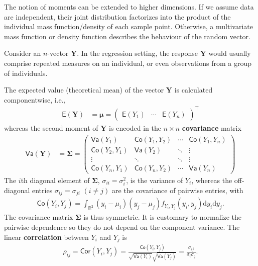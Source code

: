 \documentclass[
  11pt,
  letterpaper,
]{book}
\theoremstyle{definition}
\theoremstyle{definition}
\theoremstyle{definition}
\theoremstyle{remark}
\begin{document}
The notion of moments can be extended to higher dimensions. If we assume data are independent, their joint distribution factorizes into the product of the individual mass function/density of each sample point. Otherwise, a multivariate mass function or density function describes the behaviour of the random vector.

Consider an \(n\)-vector \(\boldsymbol{Y}\). In the regression setting, the response \(\boldsymbol{Y}\) would usually comprise repeated measures on an individual, or even observations from a group of individuals.

The expected value (theoretical mean) of the vector \(\boldsymbol{Y}\) is calculated componentwise, i.e.,
\begin{align*}
\mathsf{E}(\boldsymbol{Y}) &= \boldsymbol{\mu}=
\begin{pmatrix}
\mathsf{E}(Y_1) &
\cdots  &
\mathsf{E}(Y_n)
\end{pmatrix}^\top
\end{align*}
whereas the second moment of \(\boldsymbol{Y}\) is encoded in the \(n \times n\) \textbf{covariance} matrix
\begin{align*}
\mathsf{Va}(\boldsymbol{Y}) &= \boldsymbol{\Sigma} = \begin{pmatrix} \mathsf{Va}(Y_1) & \mathsf{Co}(Y_1, Y_2)  & \cdots & \mathsf{Co}(Y_1, Y_n) \\
\mathsf{Co}(Y_2, Y_1) & \mathsf{Va}(Y_2) & \ddots & \vdots \\
\vdots & \ddots & \ddots & \vdots \\
\mathsf{Co}(Y_n, Y_1) & \mathsf{Co}(Y_n, Y_2) &\cdots & \mathsf{Va}(Y_n)
\end{pmatrix}
\end{align*}
The \(i\)th diagonal element of \(\boldsymbol{\Sigma}\), \(\sigma_{ii}=\sigma_i^2\), is the variance of \(Y_i\), whereas the off-diagonal entries \(\sigma_{ij}=\sigma_{ji}\) \((i \neq j)\) are the covariance of pairwise entries, with
\begin{align*}
\mathsf{Co}(Y_i, Y_j) = \int_{\mathbb{R}^2} (y_i-\mu_i)(y_j-\mu_j) f_{Y_i, Y_j}(y_i, y_j) \mathrm{d} y_i \mathrm{d} y_j.
\end{align*}
The covariance matrix \(\boldsymbol{\Sigma}\) is thus symmetric. It is customary to normalize the pairwise dependence so they do not depend on the component variance. The linear \textbf{correlation} between \(Y_i\) and \(Y_j\) is
\begin{align*}
\rho_{ij}=\mathsf{Cor}(Y_i,Y_j)=\frac{\mathsf{Co}(Y_i, Y_j)}{\sqrt{\mathsf{Va}(Y_i)}\sqrt{\mathsf{Va}(Y_j)}}=\frac{\sigma_{ij}}{\sigma_i\sigma_j}.
\end{align*}
\end{document}
